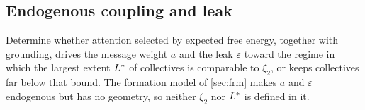 \subsection{Endogenous coupling and leak}\label{sup:sca-endogenous-coupling-and-leak}

\begin{openproblem}\label{open:sca-endogenous}
Determine whether attention selected by expected free energy, together with grounding, drives the message weight $a$ and the leak $\varepsilon$ toward the regime in which the largest extent $L^{\ast}$ of collectives is comparable to $\xi_2$, or keeps collectives far below that bound. The formation model of \cref{sec:frm} makes $a$ and $\varepsilon$ endogenous but has no geometry, so neither $\xi_2$ nor $L^{\ast}$ is defined in it.
\end{openproblem}
